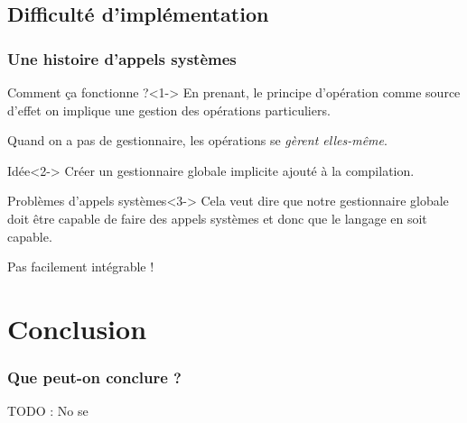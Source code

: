 \documentclass{beamer}
\begin{document}
\subsection{Difficulté d'implémentation}
\begin{frame}
	\frametitle{Une histoire d'appels systèmes}
	\begin{block}{Comment ça fonctionne ?}<1->
		En prenant, le principe d'opération comme source d'effet on implique une gestion des opérations particuliers.

		Quand on a pas de gestionnaire, les opérations se \textit{gèrent elles-même}.
	\end{block}

	\begin{block}{Idée}<2->
		Créer un gestionnaire globale implicite ajouté à la compilation. 
	\end{block}

	\begin{alertblock}{Problèmes d'appels systèmes}<3->
		Cela veut dire que notre
		gestionnaire globale doit être capable de faire des appels systèmes et donc que le langage en soit capable.

		\alert{Pas facilement intégrable !}
	\end{alertblock}
\end{frame}

\section{Conclusion}
\begin{frame}
	\frametitle{Que peut-on conclure ?}
	TODO : No se

	
\end{frame}
\end{document}
